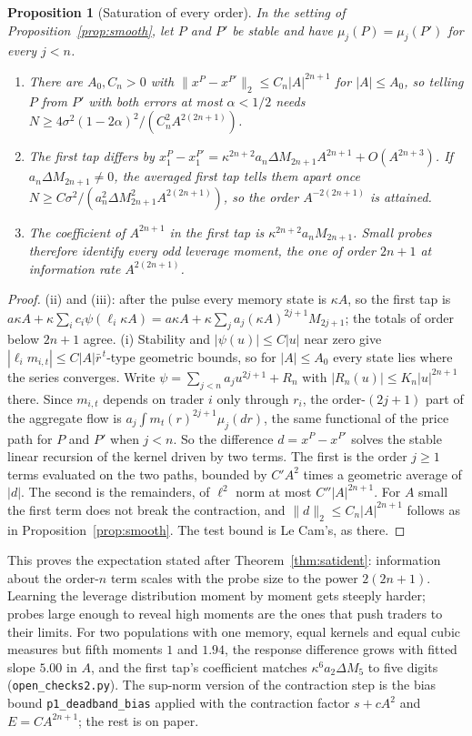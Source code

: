 \documentclass[12pt]{article}
\newtheorem{proposition}[theorem]{Proposition}
\theoremstyle{definition}
\theoremstyle{remark}
\begin{document}
\begin{proposition}[Saturation of every order]\label{prop:smoothn}
In the setting of Proposition~\ref{prop:smooth}, let $P$ and $P'$ be stable and have $\mu_j(P)=\mu_j(P')$ for every $j<n$.
\begin{enumerate}[label=(\roman*),itemsep=1pt]
\item There are $A_0,C_n>0$ with $\|x^P-x^{P'}\|_2\le C_n|A|^{2n+1}$ for $|A|\le A_0$, so telling $P$ from $P'$ with both errors at most $\alpha<1/2$ needs $N\ge4\sigma^2(1-2\alpha)^2/(C_n^2A^{2(2n+1)})$.
\item The first tap differs by $x^P_1-x^{P'}_1=\kappa^{2n+2}a_n\Delta M_{2n+1}A^{2n+1}+O(A^{2n+3})$. If $a_n\Delta M_{2n+1}\ne0$, the averaged first tap tells them apart once $N\ge C\sigma^2/(a_n^2\Delta M_{2n+1}^2A^{2(2n+1)})$, so the order $A^{-2(2n+1)}$ is attained.
\item The coefficient of $A^{2n+1}$ in the first tap is $\kappa^{2n+2}a_nM_{2n+1}$. Small probes therefore identify every odd leverage moment, the one of order $2n+1$ at information rate $A^{2(2n+1)}$.
\end{enumerate}
\end{proposition}

\begin{proof}
(ii) and (iii): after the pulse every memory state is $\kappa A$, so the first tap is $a\kappa A+\kappa\sum_ic_i\psi(\ell_i\kappa A)=a\kappa A+\kappa\sum_ja_j(\kappa A)^{2j+1}M_{2j+1}$; the totals of order below $2n+1$ agree. (i) Stability and $|\psi(u)|\le C|u|$ near zero give $|\ell_im_{i,t}|\le C|A|\bar r^{\,t}$-type geometric bounds, so for $|A|\le A_0$ every state lies where the series converges. Write $\psi=\sum_{j<n}a_ju^{2j+1}+R_n$ with $|R_n(u)|\le K_n|u|^{2n+1}$ there. Since $m_{i,t}$ depends on trader $i$ only through $r_i$, the order-$(2j+1)$ part of the aggregate flow is $a_j\int m_t(r)^{2j+1}\mu_j(dr)$, the same functional of the price path for $P$ and $P'$ when $j<n$. So the difference $d=x^P-x^{P'}$ solves the stable linear recursion of the kernel driven by two terms. The first is the order $j\ge1$ terms evaluated on the two paths, bounded by $C'A^2$ times a geometric average of $|d|$. The second is the remainders, of $\ell^2$ norm at most $C''|A|^{2n+1}$. For $A$ small the first term does not break the contraction, and $\|d\|_2\le C_n|A|^{2n+1}$ follows as in Proposition~\ref{prop:smooth}. The test bound is Le Cam's, as there.
\end{proof}

This proves the expectation stated after Theorem~\ref{thm:satident}: information about the order-$n$ term scales with the probe size to the power $2(2n+1)$. Learning the leverage distribution moment by moment gets steeply harder; probes large enough to reveal high moments are the ones that push traders to their limits. For two populations with one memory, equal kernels and equal cubic measures but fifth moments $1$ and $1.94$, the response difference grows with fitted slope $5.00$ in $A$, and the first tap's coefficient matches $\kappa^6a_2\Delta M_5$ to five digits (\nolinkurl{open_checks2.py}). The sup-norm version of the contraction step is the bias bound \texttt{p1\_deadband\_bias} applied with the contraction factor $s+cA^2$ and $E=CA^{2n+1}$; the rest is on paper.
\end{document}
